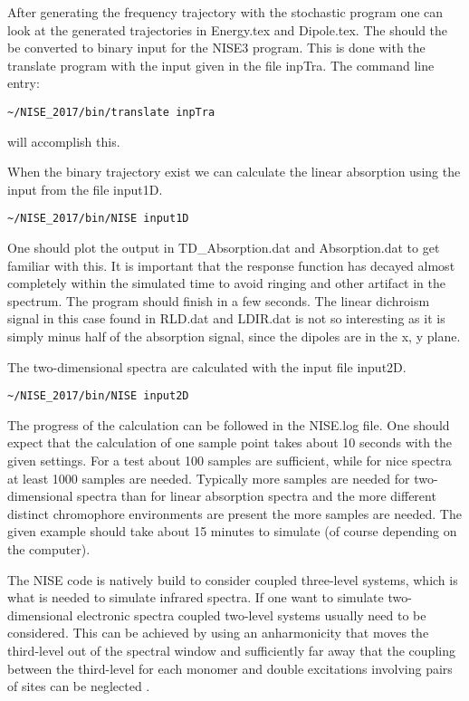After generating the frequency trajectory with the stochastic program one can look at the generated
trajectories in Energy.tex and Dipole.tex. The should the be converted to binary input for the NISE3
program. This is done with the translate program with the input given in the file inpTra.
The command line entry:
\begin{verbatim}
~/NISE_2017/bin/translate inpTra
\end{verbatim}
will accomplish this.

When the binary trajectory exist we can calculate the linear absorption using the input from the file input1D.
\begin{verbatim}
~/NISE_2017/bin/NISE input1D
\end{verbatim}
One should plot the output in TD\_Absorption.dat and Absorption.dat to get familiar with this. It is 
important that the response function has decayed almost completely within the simulated 
time to avoid ringing and other artifact in the spectrum. The program should finish in a 
few seconds. The linear dichroism signal in this case found in RLD.dat and LDIR.dat is 
not so interesting as it is simply minus half of the absorption signal, since the dipoles are in the 
x, y plane. 

The two-dimensional spectra are calculated with the input file input2D.
\begin{verbatim}
~/NISE_2017/bin/NISE input2D
\end{verbatim}
The progress of the calculation can be followed in the NISE.log file. One should expect that the calculation of one sample point takes about 10 seconds with the given settings. For a test about 100 samples are sufficient, while for nice spectra at least 1000 samples are needed. Typically more samples are needed for two-dimensional spectra than for linear absorption spectra and the more different distinct chromophore environments are present the more samples are needed. The given example should take about 15 minutes to simulate (of course depending on the computer).

The NISE code is natively build to consider coupled three-level systems, which is what is needed to simulate infrared spectra. If one want to simulate two-dimensional electronic spectra coupled two-level systems usually need to be considered. This can be achieved by using an anharmonicity that moves the third-level out of the spectral window and sufficiently far away that the coupling between the third-level for each monomer and double excitations involving pairs of sites can be neglected \cite{Olbrich.2011.JPCB.115.8609,Liang.2012.JCTC.8.1706}. 

